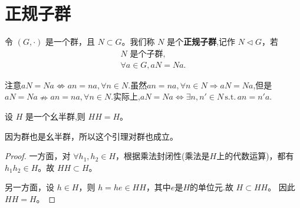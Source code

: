 \documentclass[../../main.tex]{subfiles}
\begin{document}
\section{正规子群}

\begin{definition}[正规子群]
令 $(G,\cdot)$ 是一个群，且 $N\subset G$。我们称 $N$ 是个\textbf{正规子群},记作 $N\lhd G$，若
\begin{gather*}
N\text{ 是个子群},\\
\forall a\in G, aN = Na.
\end{gather*}
\end{definition}
\begin{remark}
注意$aN=Na\nLeftrightarrow an=na,\forall n\in N.$虽然$an=na,\forall n\in N\Rightarrow aN=Na$,但是$aN=Na\nRightarrow an=na,\forall n\in N.$实际上,$aN=Na\Leftrightarrow \exists n,n' \in N\,\mathrm{s}.\mathrm{t}.\,an=n'a.$
\end{remark}

\begin{lemma}\label{lemma:子群或子幺半群与自身的乘积还等于其本身}
设 $H$ 是一个幺半群,则 $HH = H$。
\end{lemma}
\begin{note}
因为群也是幺半群，所以这个引理对群也成立。
\end{note}
\begin{proof}
一方面，对 $\forall h_1,h_2\in H$，根据乘法封闭性(乘法是$H$上的代数运算)，都有 $h_1h_2\in H$。故 $HH\subset H$。

另一方面，设 $h\in H$，则 $h = he\in HH$，其中$e$是$H$的单位元.故 $H\subset HH$。
因此 $HH = H$。 
\end{proof}
\end{document}
